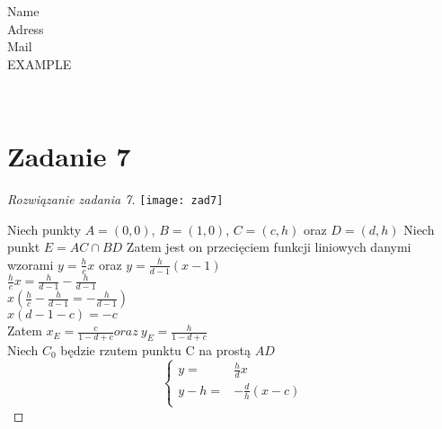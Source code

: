 \documentclass[12pt,a4paper]{article}
\begin{document}
\newtheorem{fakt}{Fakt}
\begin{flushleft}
Name\\
Adress\\
Mail\\
EXAMPLE\\

\end{flushleft}\


\section*{Zadanie 7}



\begin{proof}[Rozwiązanie zadania 7]
\texttt{[image: zad7]}

Niech punkty $A=(0,0)$, $B=(1,0)$, $C=(c,h)$ oraz $D=(d,h)$
Niech punkt $E=AC \cap BD$
Zatem jest on przecięciem funkcji liniowych danymi wzorami $y=\frac{h}{c}x$ oraz $y=\frac{h}{d-1}(x-1)$
\\ $\frac{h}{c}x=\frac{h}{d-1}-\frac{h}{d-1}$
\\$x(\frac{h}{c}-\frac{h}{d-1}=-	\frac{h}{d-1})$
\\$x(d-1-c)=-c$
\\Zatem $x_{E}=\frac{c}{1-d+c} oraz \ y_{E}=\frac{h}{1-d+c}$
\\ Niech $C_{0}$ będzie rzutem punktu C na prostą $AD$ 
$$\left\{\begin{array}{rcl}

y=&\frac{h}{d}x \\
y-h=& -\frac{d}{h}(x-c) \\
\end{array} \right.$$

\end{proof}
\end{document}
